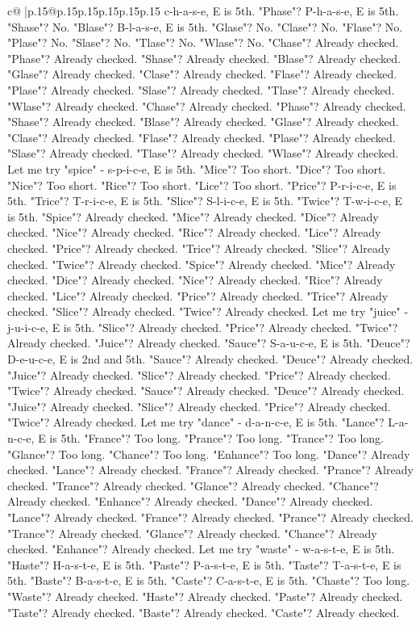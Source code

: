 \documentclass{article}
\begin{document}
{\begin{supertabular}{c@{$\;$}|p{.15\linewidth}@{}p{.15\linewidth}p{.15\linewidth}p{.15\linewidth}p{.15\linewidth}p{.15\linewidth}}
{{{c{-}h{-}a{-}s{-}e, E is 5th. "Phase"? P{-}h{-}a{-}s{-}e, E is 5th. "Shase"? No. "Blase"? B{-}l{-}a{-}s{-}e, E is 5th. "Glase"? No. "Clase"? No. "Flase"? No. "Plase"? No. "Slase"? No. "Tlase"? No. "Wlase"? No. "Chase"? Already checked. "Phase"? Already checked. "Shase"? Already checked. "Blase"? Already checked. "Glase"? Already checked. "Clase"? Already checked. "Flase"? Already checked. "Plase"? Already checked. "Slase"? Already checked. "Tlase"? Already checked. "Wlase"? Already checked. "Chase"? Already checked. "Phase"? Already checked. "Shase"? Already checked. "Blase"? Already checked. "Glase"? Already checked. "Clase"? Already checked. "Flase"? Already checked. "Plase"? Already checked. "Slase"? Already checked. "Tlase"? Already checked. "Wlase"? Already checked. Let me try "spice" {-} s{-}p{-}i{-}c{-}e, E is 5th. "Mice"? Too short. "Dice"? Too short. "Nice"? Too short. "Rice"? Too short. "Lice"? Too short. "Price"? P{-}r{-}i{-}c{-}e, E is 5th. "Trice"? T{-}r{-}i{-}c{-}e, E is 5th. "Slice"? S{-}l{-}i{-}c{-}e, E is 5th. "Twice"? T{-}w{-}i{-}c{-}e, E is 5th. "Spice"? Already checked. "Mice"? Already checked. "Dice"? Already checked. "Nice"? Already checked. "Rice"? Already checked. "Lice"? Already checked. "Price"? Already checked. "Trice"? Already checked. "Slice"? Already checked. "Twice"? Already checked. "Spice"? Already checked. "Mice"? Already checked. "Dice"? Already checked. "Nice"? Already checked. "Rice"? Already checked. "Lice"? Already checked. "Price"? Already checked. "Trice"? Already checked. "Slice"? Already checked. "Twice"? Already checked. Let me try "juice" {-} j{-}u{-}i{-}c{-}e, E is 5th. "Slice"? Already checked. "Price"? Already checked. "Twice"? Already checked. "Juice"? Already checked. "Sauce"? S{-}a{-}u{-}c{-}e, E is 5th. "Deuce"? D{-}e{-}u{-}c{-}e, E is 2nd and 5th. "Sauce"? Already checked. "Deuce"? Already checked. "Juice"? Already checked. "Slice"? Already checked. "Price"? Already checked. "Twice"? Already checked. "Sauce"? Already checked. "Deuce"? Already checked. "Juice"? Already checked. "Slice"? Already checked. "Price"? Already checked. "Twice"? Already checked. Let me try "dance" {-} d{-}a{-}n{-}c{-}e, E is 5th. "Lance"? L{-}a{-}n{-}c{-}e, E is 5th. "France"? Too long. "Prance"? Too long. "Trance"? Too long. "Glance"? Too long. "Chance"? Too long. "Enhance"? Too long. "Dance"? Already checked. "Lance"? Already checked. "France"? Already checked. "Prance"? Already checked. "Trance"? Already checked. "Glance"? Already checked. "Chance"? Already checked. "Enhance"? Already checked. "Dance"? Already checked. "Lance"? Already checked. "France"? Already checked. "Prance"? Already checked. "Trance"? Already checked. "Glance"? Already checked. "Chance"? Already checked. "Enhance"? Already checked. Let me try "waste" {-} w{-}a{-}s{-}t{-}e, E is 5th. "Haste"? H{-}a{-}s{-}t{-}e, E is 5th. "Paste"? P{-}a{-}s{-}t{-}e, E is 5th. "Taste"? T{-}a{-}s{-}t{-}e, E is 5th. "Baste"? B{-}a{-}s{-}t{-}e, E is 5th. "Caste"? C{-}a{-}s{-}t{-}e, E is 5th. "Chaste"? Too long. "Waste"? Already checked. "Haste"? Already checked. "Paste"? Already checked. "Taste"? Already checked. "Baste"? Already checked. "Caste"? Already checked. }}}
\end{supertabular}}
\end{document}
